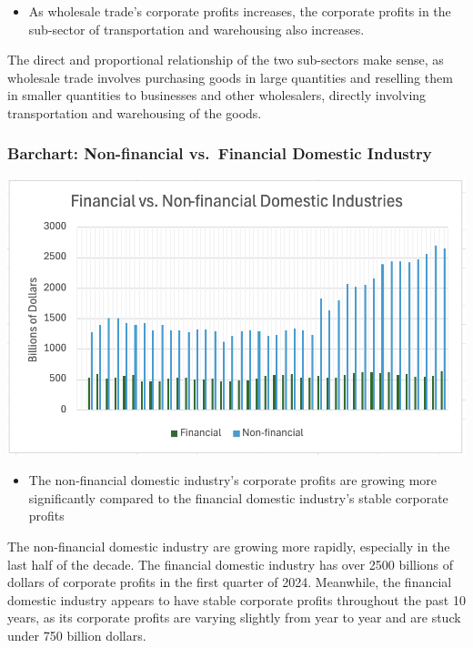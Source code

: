 \documentclass[
  letterpaper,
  DIV=11,
  numbers=noendperiod]{scrreprt}
\providecommand{\tightlist}{%
  \setlength{\itemsep}{0pt}\setlength{\parskip}{0pt}}\usepackage{longtable,booktabs,array}
\begin{document}
\begin{itemize}
\tightlist
\item
  As wholesale trade's corporate profits increases, the corporate
  profits in the sub-sector of transportation and warehousing also
  increases.
\end{itemize}

The direct and proportional relationship of the two sub-sectors make
sense, as wholesale trade involves purchasing goods in large quantities
and reselling them in smaller quantities to businesses and other
wholesalers, directly involving transportation and warehousing of the
goods.

\subsubsection{Barchart: Non-financial vs.~Financial Domestic
Industry}\label{barchart-non-financial-vs.-financial-domestic-industry}

\includegraphics{./Excel_1_Unit/Week1_Janice/Week 1/Week 1 Friday/Barchart.png}

\begin{itemize}
\tightlist
\item
  The non-financial domestic industry's corporate profits are growing
  more significantly compared to the financial domestic industry's
  stable corporate profits
\end{itemize}

The non-financial domestic industry are growing more rapidly, especially
in the last half of the decade. The financial domestic industry has over
2500 billions of dollars of corporate profits in the first quarter of
2024. Meanwhile, the financial domestic industry appears to have stable
corporate profits throughout the past 10 years, as its corporate profits
are varying slightly from year to year and are stuck under 750 billion
dollars.
\end{document}
